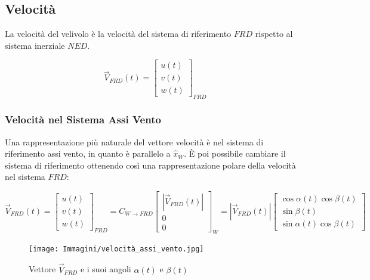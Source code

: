 \subsection{Velocità}
La velocità del velivolo è la velocità del sistema di riferimento $FRD$ rispetto al sistema inerziale $NED$.

\begin{equation}
    \label{eq:velocitaFRD}
    \vec{V}_{FRD}(t) = \begin{bmatrix}
        u(t) \\
        v(t) \\
        w(t)
    \end{bmatrix}_{FRD}
\end{equation}

\subsubsection{Velocità nel Sistema Assi Vento}
Una rappresentazione più naturale del vettore velocità è nel sistema di riferimento assi vento, in quanto è parallelo a $\hat{x}_{W}$.
È poi possibile cambiare il sistema di riferimento ottenendo così una rappresentazione polare della velocità nel sistema $FRD$:

\begin{equation}
    \label{eq:velocitaWind}
    \vec{V}_{FRD}(t) = \begin{bmatrix}
        u(t) \\
        v(t) \\
        w(t)
    \end{bmatrix}_{FRD} = C_{W \rightarrow FRD}\begin{bmatrix}
        |\vec{V}_{FRD}(t)| \\
        0                  \\
        0
    \end{bmatrix}_{W} = |\vec{V}_{FRD}(t)|\begin{bmatrix}
        \cos\alpha(t)\cos\beta(t) \\
        \sin\beta(t)              \\
        \sin\alpha(t)\cos\beta(t)
    \end{bmatrix}
\end{equation}

\begin{figure}[H]
    \centering
    \texttt{[image: Immagini/velocità\_assi\_vento.jpg]}
    \caption{Vettore $\vec{V}_{FRD}$ e i suoi angoli $\alpha(t)$ e $\beta(t)$}
\end{figure}

